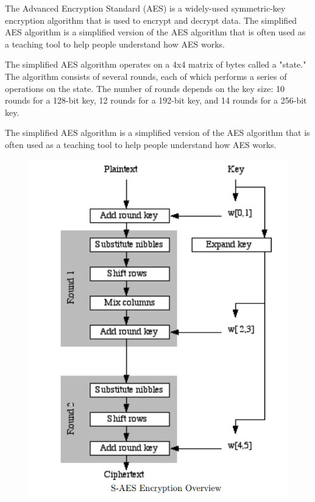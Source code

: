 \documentclass[openany]{book}
\begin{document}
The Advanced Encryption Standard (AES) is a widely-used symmetric-key encryption algorithm that is used to encrypt and decrypt data. The simplified AES algorithm is a simplified version of the AES algorithm that is often used as a teaching tool to help people understand how AES works.

The simplified AES algorithm operates on a 4x4 matrix of bytes called a "state." The algorithm consists of several rounds, each of which performs a series of operations on the state. The number of rounds depends on the key size: 10 rounds for a 128-bit key, 12 rounds for a 192-bit key, and 14 rounds for a 256-bit key.

The simplified AES algorithm is a simplified version of the AES algorithm that is often used as a teaching tool to help people understand how AES works.


\begin{figure}[H]
	\centering
	\includegraphics[scale=0.5]{saes.png}
	\caption{}
\end{figure}
\end{document}
